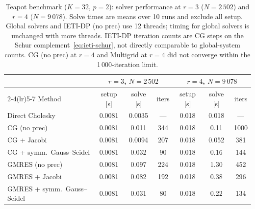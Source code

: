 \documentclass{article}
\newcommand{\npatch}{K} %
\theoremstyle{plain}
\numberwithin{equation}{section}
\begin{document}
\begin{table}[t]
    \centering
    \caption{Teapot benchmark ($\npatch = 32$, $p = 2$): solver performance at
        $r = 3$ ($N = 2\,502$) and $r = 4$ ($N = 9\,078$). Solve times are means over
        10 runs and exclude all setup. Global solvers and IETI-DP (no prec) use
        12 threads; timing for global solvers is unchanged with more threads.
        IETI-DP iteration counts are CG steps on the Schur complement~\eqref{eq:ieti-schur},
        not directly comparable to global-system counts. CG (no prec) at $r=4$ and
        Multigrid at $r=4$ did not converge within the 1\,000-iteration limit.}
    \label{tab:reference}
    \begin{tabular}{lcccccc}
        \toprule
                                      & \multicolumn{3}{c}{$r = 3$,\; $N = 2\,502$}
                                      & \multicolumn{3}{c}{$r = 4$,\; $N = 9\,078$}                                                                 \\
        \cmidrule(lr){2-4}\cmidrule(lr){5-7}
        Method                        & setup [s]                                   & solve [s]       & iters & setup [s] & solve [s]       & iters \\
        \midrule
        Direct Cholesky               & 0.0081                                      & 0.0035          & ---   & 0.018     & 0.018           & ---   \\
        CG (no prec)                  & 0.0081                                      & 0.011           & 344   & 0.018     & 0.11            & 1000  \\
        CG + Jacobi                   & 0.0081                                      & 0.0094          & 207   & 0.018     & 0.052           & 381   \\
        CG + symm.\ Gauss--Seidel     & 0.0081                                      & 0.032           & 90    & 0.018     & 0.16            & 144   \\
        GMRES (no prec)               & 0.0081                                      & 0.097           & 224   & 0.018     & 1.30            & 452   \\
        GMRES + Jacobi                & 0.0081                                      & 0.082           & 192   & 0.018     & 0.38            & 296   \\
        GMRES + symm.\ Gauss--Seidel  & 0.0081                                      & 0.031           & 80    & 0.018     & 0.22            & 134   \\

\end{tabular}
\end{table}
\end{document}
